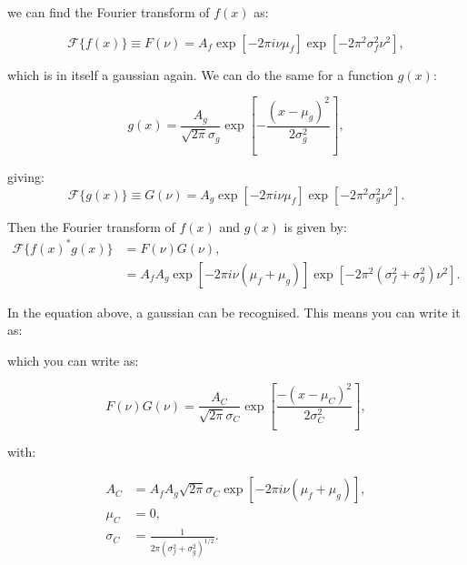 we can find the Fourier transform of $f(x)$ as:

\begin{equation}\label{eq_FT_gauss}
	\mathcal{F}\{f(x)\} \equiv F(\nu) = A_f \exp{\left[-2 \pi i \nu \mu_{f}\right]} \exp{\left[-2 \pi^{2} \sigma_{f}^{2} \nu^{2}\right]},
\end{equation}

which is in itself a gaussian again. We can do the same for a function $g(x)$:

\begin{equation}
g(x)=\frac{A_{g}}{\sqrt{2\pi}\sigma_g} \exp{\left[-\frac{\left(x-\mu_{g}\right)^{2}}{2 \sigma_{g}^{2}}\right]},
\end{equation}

giving:
\begin{equation}
	\mathcal{F}\{g(x)\} \equiv G(\nu) = A_g \exp{\left[-2 \pi i \nu \mu_{f}\right]} \exp{\left[-2 \pi^{2} \sigma_{g}^{2} \nu^{2}\right]}.
\end{equation}


Then the Fourier transform of $f(x)$ and $g(x)$ is given by:
\begin{equation}
\begin{aligned}
\mathcal{F}\{f(x)^*g(x)\} &= F(\nu)G(\nu), \\
 &=A_f A_g \exp{\left[-2 \pi i \nu\left(\mu_{f}+\mu_{g}\right)\right]} \exp{\left[-2 \pi^{2}\left(\sigma_{f}^{2}+\sigma_{g}^{2}\right) \nu^{2}\right]}.
\end{aligned}
\end{equation}

In the equation above, a gaussian can be recognised. This means you can write it as:

which you can write as:

\begin{equation}
F(\nu)G(\nu) = \frac{A_C}{\sqrt{2\pi}\sigma_C} \exp{\left[\frac{-(x-\mu_C)^2}{2\sigma_C^2}\right]},
\end{equation}

with:

\begin{equation}
\begin{aligned}
A_C &= A_f A_g \sqrt{2\pi}\sigma_C \exp{\left[-2 \pi i \nu\left(\mu_{f}+\mu_{g}\right)\right]} ,\\
\mu_C &= 0,\\
\sigma_C &= \frac{1}{2\pi(\sigma_f^2+\sigma_g^2)^{1/2}}.
\end{aligned}
\end{equation}





